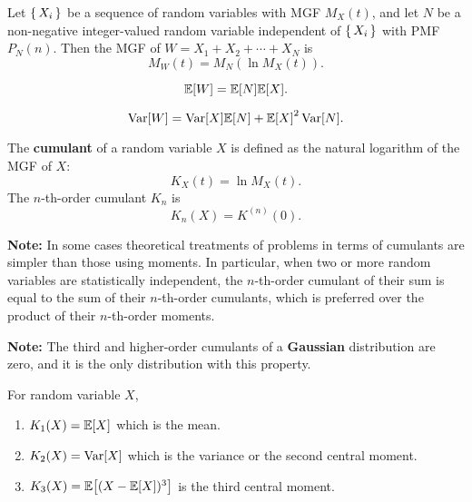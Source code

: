 \begin{theorem}
    Let $\left\lbrace\,X_i\,\right\rbrace$ be a sequence of \iid random variables with \textnormal{MGF} $M_X(t)$, and let $N$ be a non-negative integer-valued random variable independent of $\left\lbrace\,X_i\,\right\rbrace$ with \textnormal{PMF} $P_N(n)$. Then the \textnormal{MGF} of $W=X_1+X_2+\cdots+X_N$ is
    \[M_W(t)=M_N(\ln M_X(t)).\]
\end{theorem}

\begin{theorem}
    \[\E{W}=\E{N}\E{X}.\]
\end{theorem}

\begin{theorem}
    \[\Var[W]=\Var[X]\E{N}+\E{X}^2\Var[N].\]
\end{theorem}

\begin{definition}
    The \textbf{cumulant} of a random variable $X$ is defined as the natural logarithm of the \textnormal{MGF} of $X$:
    \[K_X(t)=\ln M_X(t).\]
    The $n$-th-order cumulant $K_n$ is
    \[K_n(X)=K^{(n)}(0).\]
\end{definition}

\textbf{Note:} In some cases theoretical treatments of problems in terms of cumulants are simpler than those using moments. In particular, when two or more random variables are statistically independent, the $n$-th-order cumulant of their sum is equal to the sum of their $n$-th-order cumulants, which is preferred over the product of their $n$-th-order moments.

\textbf{Note:} The third and higher-order cumulants of a \textbf{Gaussian} distribution are zero, and it is the only distribution with this property.

\begin{theorem}
    For random variable $X$,
    \begin{enumerate}
        \item $K_1(X)=\E{X}$ which is the mean.
        \item $K_2(X)=\operatorname{\textnormal{Var}}[X]$ which is the variance or the second central moment.
        \item $K_3(X)=\E{(X-\E{X})^3}$ is the third central moment.
    \end{enumerate}
\end{theorem}

